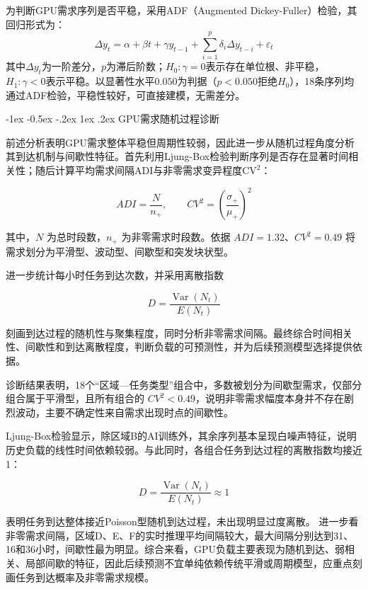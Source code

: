 \documentclass{article}
\makeatletter
\renewcommand\subsection{\@startsection{subsection}{2}{\z@}%
 {-1ex \@plus -0.5ex \@minus -.2ex}
 {1ex \@plus.2ex} 
 {\heiti\zihao{4}}}
\makeatother
\begin{document}
为判断GPU需求序列是否平稳，采用ADF（Augmented Dickey-Fuller）检验，其回归形式为：
\begin{equation}
\Delta y_t=\alpha+\beta t+\gamma y_{t-1}
+\sum_{i=1}^{p}\delta_i\Delta y_{t-i}+\varepsilon_t
\end{equation}
其中$\Delta y_t$为一阶差分，$p$为滞后阶数；$H_0:\gamma=0$表示存在单位根、非平稳，$H_1:\gamma<0$表示平稳。以显著性水平$0.050$为判据（$p<0.050$拒绝$H_0$），18条序列均通过ADF检验，平稳性较好，可直接建模，无需差分。

\subsection{GPU需求随机过程诊断}

前述分析表明GPU需求整体平稳但周期性较弱，因此进一步从随机过程角度分析其到达机制与间歇性特征。首先利用Ljung-Box检验判断序列是否存在显著时间相关性；随后计算平均需求间隔ADI与非零需求变异程度$\mathrm{CV}^2$\cite{syntetos2005}：

\begin{equation}
ADI=\frac{N}{n_{+}},\qquad
CV^2=\left(\frac{\sigma_{+}}{\mu_{+}}\right)^2
\end{equation}

其中，$N$ 为总时段数，$n_{+}$ 为非零需求时段数。依据 $ADI=1.32$、$CV^2=0.49$ 将需求划分为平滑型、波动型、间歇型和突发块状型\cite{syntetos2005}。

进一步统计每小时任务到达次数，并采用离散指数

\begin{equation}
D=\frac{\operatorname{Var}(N_t)}{E(N_t)}
\end{equation}

刻画到达过程的随机性与聚集程度，同时分析非零需求间隔。最终综合时间相关性、间歇性和到达离散程度，判断负载的可预测性，并为后续预测模型选择提供依据。



诊断结果表明，18个“区域—任务类型”组合中，多数被划分为间歇型需求，仅部分组合属于平滑型，且所有组合的 $CV^2<0.49$，说明非零需求幅度本身并不存在剧烈波动，主要不确定性来自需求出现时点的间歇性。

Ljung-Box检验显示，除区域B的AI训练外，其余序列基本呈现白噪声特征，说明历史负载的线性时间依赖较弱。与此同时，各组合任务到达过程的离散指数均接近1：

\begin{equation}
D=\frac{\operatorname{Var}(N_t)}{E(N_t)}\approx1
\end{equation}

表明任务到达整体接近Poisson型随机到达过程，未出现明显过度离散。
进一步看非零需求间隔，区域D、E、F的实时推理平均间隔较大，最大间隔分别达到31、16和36小时，间歇性最为明显。综合来看，GPU负载主要表现为随机到达、弱相关、局部间歇的特征，因此后续预测不宜单纯依赖传统平滑或周期模型，应重点刻画任务到达概率及非零需求规模。
\end{document}
